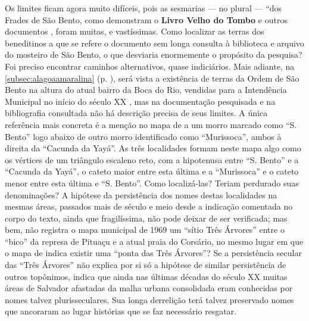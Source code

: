 Os limites ficam agora muito difíceis, pois as sesmarias --- no plural --- ``dos Frades de São Bento, como demonstram o \textbf{Livro Velho do Tombo} \cite{bento_tombo_1945} e outros documentos \cite{CEDURB1978}, foram muitas, e vastíssimas. Como localizar as terras dos beneditinos a que se refere o documento sem longa consulta à biblioteca e arquivo do mosteiro de São Bento, o que desviaria enormemente o propósito da pesquisa? Foi preciso encontrar caminhos alternativos, quase indiciários. Mais adiante, na \autoref{subsec:alagoaamaralina} (p. \pageref{subsec:alagoaamaralina}), será vista a existência de terras da Ordem de São Bento na altura do atual bairro da Boca do Rio, vendidas para a Intendência Municipal no início do século XX \cite{teixeira_doacoes_1978}, mas na documentação pesquisada e na bibliografia consultada não há descrição precisa de seus limites. A única referência mais concreta é a menção no mapa de  a um morro marcado como ``S. Bento'' logo abaixo de outro morro identificado como ``Murissoca'', ambos à direita da ``Cacunda da Yayá''. As três localidades formam neste mapa algo como os vértices de um triângulo escaleno reto, com a hipotenusa entre ``S. Bento'' e a ``Cacunda da Yayá'', o cateto maior entre esta última e a ``Murissoca'' e o cateto menor entre esta última e ``S. Bento''. Como localizá-las? Teriam perdurado suas denominações? A hipótese da persistência dos nomes destas localidades na mesmas áreas, passados mais de século e meio desde a indicação comentada no corpo do texto, ainda que fragilíssima, não pode deixar de ser verificada; mas bem, não registra o mapa municipal de 1969 um ``sítio Três Árvores'' entre o ``bico'' da represa de Pituaçu e a atual praia do Corsário, no mesmo lugar em que o mapa de  indica existir uma ``ponta das Três Árvores''? Se a persistência secular das ``Três Árvores'' não explica por si só a hipótese de similar persistência de outros topônimos, indica que ainda nas últimas décadas do século XX muitas áreas de Salvador afastadas da malha urbana consolidada eram conhecidas por nomes talvez plurisseculares. Sua longa derrelição terá talvez preservado nomes que ancoraram ao lugar histórias que se faz necessário resgatar. 

